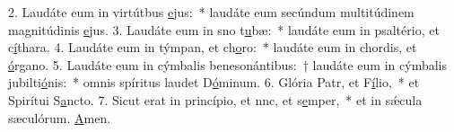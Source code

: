 2. Laudáte eum in virtútbus \uline{e}jus:~* laudáte eum secúndum multitúdinem magnitúdinis \uline{e}jus.
3. Laudáte eum in sno t\uline{u}bæ:~* laudáte eum in psaltério, et c\uline{í}thara.
4. Laudáte eum in týmpan, et ch\uline{o}ro:~* laudáte eum in chordis, et \uline{ó}rgano.
5. Laudáte eum in cýmbalis benesonántibus:~† laudáte eum in cýmbalis jubilti\uline{ó}nis:~* omnis spíritus laudet D\uline{ó}minum.
6. Glória Patr, et F\uline{í}lio,~* et Spirítui S\uline{a}ncto.
7. Sicut erat in princípio, et nnc, et s\uline{e}mper,~* et in sǽcula sæculórum. \uline{A}men.
